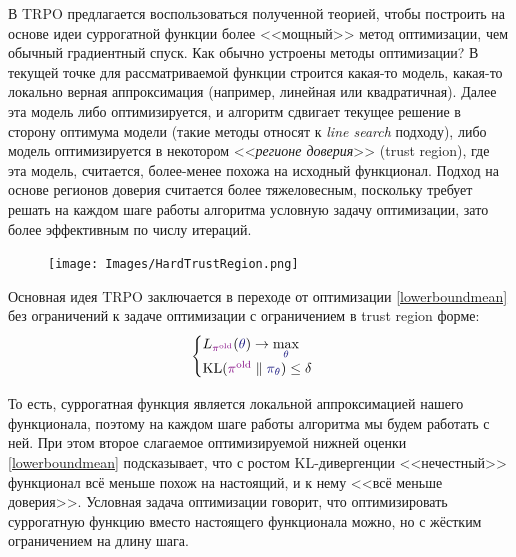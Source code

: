 В TRPO предлагается воспользоваться полученной теорией, чтобы построить на основе идеи суррогатной функции более <<мощный>> метод оптимизации, чем обычный градиентный спуск. Как обычно устроены методы оптимизации? В текущей точке для рассматриваемой функции строится какая-то модель, какая-то локально верная аппроксимация (например, линейная или квадратичная). Далее эта модель либо оптимизируется, и алгоритм сдвигает текущее решение в сторону оптимума модели (такие методы относят к \emph{line search} подходу), либо модель оптимизируется в некотором <<\emph{регионе доверия}>> (trust region), где эта модель, считается, более-менее похожа на исходный функционал. Подход на основе регионов доверия считается более тяжеловесным, поскольку требует решать на каждом шаге работы алгоритма условную задачу оптимизации, зато более эффективным по числу итераций.

\begin{figure}
\vspace{-0.5cm}
\centering
\texttt{[image: Images/HardTrustRegion.png]}
\vspace{-0.9cm}
\end{figure}

Основная идея TRPO заключается в переходе от оптимизации \eqref{lowerboundmean} без ограничений к задаче оптимизации с ограничением в trust region форме:
\begin{equation}\label{trustregion}
\begin{cases}
L_{\textcolor{ChadPurple}{\pi^{\old}}}(\textcolor{ChadBlue}{\theta}) \to \max\limits_{\textcolor{ChadBlue}{\theta}} \\
\KL(\textcolor{ChadPurple}{\pi^{\old}} \parallel \textcolor{ChadBlue}{\pi_\theta}) \le \delta
\end{cases}
\end{equation}

То есть, суррогатная функция является локальной аппроксимацией нашего функционала, поэтому на каждом шаге работы алгоритма мы будем работать с ней. При этом второе слагаемое оптимизируемой нижней оценки \eqref{lowerboundmean} подсказывает, что с ростом KL-дивергенции <<нечестный>> функционал всё меньше похож на настоящий, и к нему <<всё меньше доверия>>. Условная задача оптимизации говорит, что оптимизировать суррогатную функцию вместо настоящего функционала можно, но с жёстким ограничением на длину шага.

